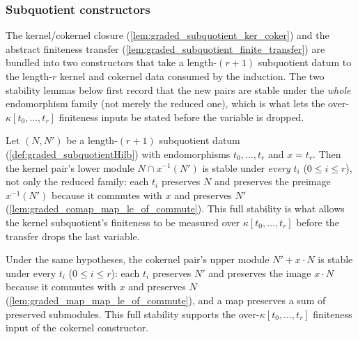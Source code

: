 \subsubsection*{Subquotient constructors}

The kernel/cokernel closure (\cref{lem:graded_subquotient_ker_coker}) and the
abstract finiteness transfer (\cref{lem:graded_subquotient_finite_transfer}) are
bundled into two constructors that take a length-\((r+1)\) subquotient datum to the
length-\(r\) kernel and cokernel data consumed by the induction. The two stability
lemmas below first record that the new pairs are stable under the \emph{whole}
endomorphism family (not merely the reduced one), which is what lets the over-\(\kappa[t_0,\dots,t_r]\)
finiteness inputs be stated before the variable is dropped.

\begin{lemma}

  \label{lem:graded_ker_stable_full}
  Let \((N, N')\) be a length-\((r+1)\) subquotient datum
  (\cref{def:graded_subquotientHilb}) with endomorphisms \(t_0, \dots, t_r\) and
  \(x = t_r\). Then the kernel pair's lower module \(N \cap x^{-1}(N')\) is stable
  under \emph{every} \(t_i\) (\(0 \le i \le r\)), not only the reduced family: each
  \(t_i\) preserves \(N\) and preserves the preimage \(x^{-1}(N')\) because it
  commutes with \(x\) and preserves \(N'\)
  (\cref{lem:graded_comap_map_le_of_commute}). This full stability is what allows the
  kernel subquotient's finiteness to be measured over \(\kappa[t_0, \dots, t_r]\)
  before the transfer drops the last variable.
\end{lemma}

\begin{lemma}

  \label{lem:graded_coker_stable_full}
  Under the same hypotheses, the cokernel pair's upper module \(N' + x \cdot N\) is
  stable under every \(t_i\) (\(0 \le i \le r\)): each \(t_i\) preserves \(N'\) and
  preserves the image \(x \cdot N\) because it commutes with \(x\) and preserves
  \(N\) (\cref{lem:graded_map_map_le_of_commute}), and a map preserves a sum of
  preserved submodules. This full stability supports the over-\(\kappa[t_0, \dots,
  t_r]\) finiteness input of the cokernel constructor.
\end{lemma}

